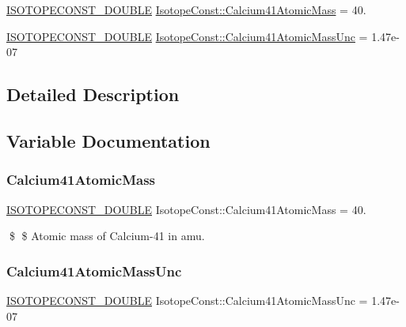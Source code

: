 \begin{DoxyCompactItemize}
\item 
\mbox{\hyperlink{group___isotope_const-_macros_ga8f45a7272ce02c0b4c65c44636ed719a}{I\+S\+O\+T\+O\+P\+E\+C\+O\+N\+S\+T\+\_\+\+D\+O\+U\+B\+LE}} \mbox{\hyperlink{group___isotope_const-_calcium-_ca41_ga4413be8364f975b4ec0057205f649062}{Isotope\+Const\+::\+Calcium41\+Atomic\+Mass}} = 40.
\item 
\mbox{\hyperlink{group___isotope_const-_macros_ga8f45a7272ce02c0b4c65c44636ed719a}{I\+S\+O\+T\+O\+P\+E\+C\+O\+N\+S\+T\+\_\+\+D\+O\+U\+B\+LE}} \mbox{\hyperlink{group___isotope_const-_calcium-_ca41_ga2428221ce96e4d8834db6fee71b47851}{Isotope\+Const\+::\+Calcium41\+Atomic\+Mass\+Unc}} = 1.\+47e-\/07
\end{DoxyCompactItemize}


\subsection{Detailed Description}


\subsection{Variable Documentation}
\mbox{\label{group___isotope_const-_calcium-_ca41_ga4413be8364f975b4ec0057205f649062}} 
\subsubsection{\texorpdfstring{Calcium41\+Atomic\+Mass}{Calcium41AtomicMass}}
{\footnotesize\ttfamily \mbox{\hyperlink{group___isotope_const-_macros_ga8f45a7272ce02c0b4c65c44636ed719a}{I\+S\+O\+T\+O\+P\+E\+C\+O\+N\+S\+T\+\_\+\+D\+O\+U\+B\+LE}} Isotope\+Const\+::\+Calcium41\+Atomic\+Mass = 40.}

\$ \$ Atomic mass of Calcium-\/41 in amu. \mbox{\label{group___isotope_const-_calcium-_ca41_ga2428221ce96e4d8834db6fee71b47851}} 
\subsubsection{\texorpdfstring{Calcium41\+Atomic\+Mass\+Unc}{Calcium41AtomicMassUnc}}
{\footnotesize\ttfamily \mbox{\hyperlink{group___isotope_const-_macros_ga8f45a7272ce02c0b4c65c44636ed719a}{I\+S\+O\+T\+O\+P\+E\+C\+O\+N\+S\+T\+\_\+\+D\+O\+U\+B\+LE}} Isotope\+Const\+::\+Calcium41\+Atomic\+Mass\+Unc = 1.\+47e-\/07}

